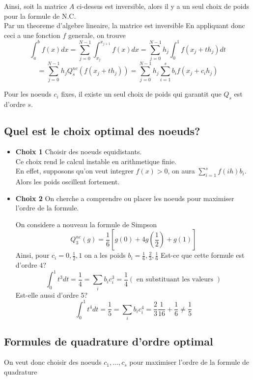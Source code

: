 \documentclass[../main.tex]{subfiles}
\begin{document}
Ainsi, soit la matrice $A$ ci-dessus est inversible, alors il y a un seul choix de poids pour la formule de N.C.\\
Par un theoreme d'algebre lineaire, la matrice est inversible
En appliquant donc ceci a une fonction $f$ generale, on trouve
\[ 
\int_{ a }^{ b }f( x) dx = \sum_{j=0}^{N-1} \int_{ x_j }^{ x_{j+1}  }f( x) dx = \sum_{j=0}^{ N-1}h_j \int_{ 0 }^{ 1 } f( x_j + th_j) dt
\]
\[ 
= \sum_{j=0}^{ N-1}h_j  Q_s^{nc} ( f( x_j + th_j) ) = \sum_{j=0}^{ N-1}h_j \sum_{i=1}^{ s}b_i f( x_j + c_i h_j) 
\]
\begin{rmq}
Pour les noeuds $c_i$ fixes, il existe un seul choix de poids qui garantit que $Q_s$ est d'ordre $s$.
\end{rmq}
\subsection*{Quel est le choix optimal des noeuds?}
\begin{itemize}
\item \textbf { Choix 1} Choisir des noeuds equidistants.\\
	Ce choix rend le calcul instable en arithmetique finie.\\
	En effet, supposons qu'on veut integrer $f( x) >0$, on aura $ \sum_{i=1}^{ s}f( ih) b_i$.\\
	Alors les poids oscillent fortement.
\item \textbf { Choix 2} On cherche a comprendre ou placer les noeuds pour maximiser l'ordre de la formule.
	\begin{exemple}
	On considere a nouveau la formule de Simpson
	\[ 
	Q_3^{nc}( g) = \frac{1}{6} \left[ g( 0) + 4 g( \frac{1}{2}) + g( 1) \right] 
	\]
	Ainsi, pour $c_i = 0,\frac{1}{2}, 1$ on a les poids $ b_i = \frac{1}{6}, \frac{2}{3}, \frac{1}{6}$ 
	Est-ce que cette formule est d'ordre $4$?
	\[ 
\int_{ 0 }^{ 1 }t^{3}dt = \frac{1}{4}= \sum_{i}^{ }b_i c_i^{3} = \frac{1}{4} ( \text{ en substituant les valeurs } ) 	
	\]
	Est-elle aussi d'ordre 5?
	\[ 
	\int_{ 0 }^{ 1 } t^{4}dt = \frac{1}{5}= \sum_{i}^{ } b_i c_i^{4}= \frac{2}{3}\frac{1}{16}+ \frac{1}{6}\neq \frac{1}{5}
	\]
		
	\end{exemple}
\end{itemize}
\subsection{Formules de quadrature d'ordre optimal}
On veut donc choisir des noeuds $c_1,\ldots, c_s$ pour maximiser l'ordre de la formule de quadrature
\end{document}
